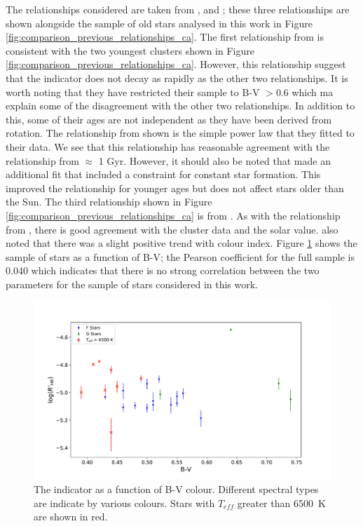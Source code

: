 The relationships considered are taken from \citet{Soderblom_etal_1991}, \citet{Lachaume_etal_1999} and \citet{Mamajek_Hillenbrand_2008}; these three relationships are shown alongside the sample of old stars analysed in this work in Figure \ref{fig:comparison_previous_relationships_ca}. The first relationship from \citet{Lachaume_etal_1999} is consistent with the two youngest clusters shown in Figure \ref{fig:comparison_previous_relationships_ca}. However, this relationship suggest that the \Rprime indicator does not decay as rapidly as the other two relationships. It is worth noting that they have restricted their sample to B-V $> 0.6$ which ma explain some of the disagreement with the other two relationships. In addition to this, some of their ages are not independent as they have been derived from rotation. The relationship from \citet{Soderblom_etal_1991} shown is the simple power law that they fitted to their data. We see that this relationship has reasonable agreement with the \citet{Mamajek_Hillenbrand_2008} relationship from $\approx$ 1 Gyr. However, it should also be noted that \citet{Soderblom_etal_1991} made an additional fit that included a constraint for constant star formation. This improved the relationship for younger ages but does not affect stars older than the Sun. The third relationship shown in Figure \ref{fig:comparison_previous_relationships_ca} is from \citet{Mamajek_Hillenbrand_2008}. As with the relationship from \citet{Soderblom_etal_1991}, there is good agreement with the cluster data and the solar value. \citet{Mamajek_Hillenbrand_2008} also noted that there was a slight positive trend with colour index. Figure \ref{fig:ca_v_bv} shows the sample of stars as a function of B-V; the Pearson coefficient for the full sample is $0.040$ which indicates that there is no strong correlation between the two parameters for the sample of stars considered in this work.

\begin{figure}
    \centering
    \includegraphics[scale=0.5]{Figures/4-Chromospheric_age/all_ca_results_vs_bv.pdf}
    \caption[\Rprime as a function of B-V colour]{The \Rprime indicator as a function of B-V colour. Different spectral types are indicate by various colours. Stars with $T_{eff}$ greater than 6500~K are shown in red.}
    \label{fig:ca_v_bv}
\end{figure}

